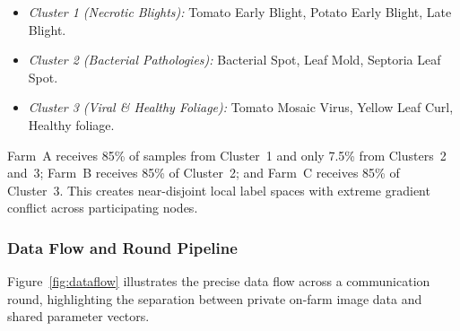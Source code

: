 \documentclass[applsci,article,submit,oneauthor,pdftex]{Definitions/mdpi}
\begin{document}
\begin{enumerate}[leftmargin=*]
\begin{itemize}
        \item \textit{Cluster 1 (Necrotic Blights):} Tomato Early Blight, Potato Early Blight, Late Blight.
        \item \textit{Cluster 2 (Bacterial Pathologies):} Bacterial Spot, Leaf Mold, Septoria Leaf Spot.
        \item \textit{Cluster 3 (Viral \& Healthy Foliage):} Tomato Mosaic Virus, Yellow Leaf Curl, Healthy foliage.
    \end{itemize}
    Farm~A receives 85\% of samples from Cluster~1 and only 7.5\% from Clusters~2 and~3; Farm~B receives 85\% of Cluster~2; and Farm~C receives 85\% of Cluster~3. This creates near-disjoint local label spaces with extreme gradient conflict across participating nodes.
\end{enumerate}

\subsubsection{Data Flow and Round Pipeline}
Figure~\ref{fig:dataflow} illustrates the precise data flow across a communication round, highlighting the separation between private on-farm image data and shared parameter vectors.
\end{document}
